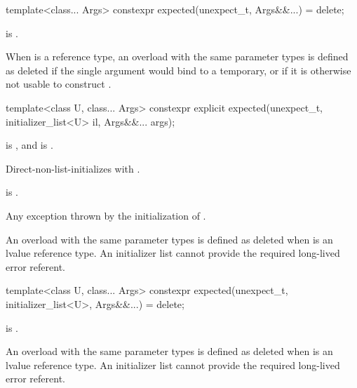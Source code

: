 %
\begin{itemdecl}
template<class... Args>
  constexpr expected(unexpect_t, Args&&...) = delete;
\end{itemdecl}

\begin{itemdescr}
\pnum
\constraints
{} is .

\pnum
\remarks
When  is a reference type, an overload with the same parameter types is defined as deleted if the single argument would bind  to a temporary, or if it is otherwise not usable to construct .
\end{itemdescr}

%
\begin{itemdecl}
template<class U, class... Args>
  constexpr explicit expected(unexpect_t, initializer_list<U> il, Args&&... args);
\end{itemdecl}

\begin{itemdescr}
\pnum
\constraints
{} is , and  is .

\pnum
\effects
Direct-non-list-initializes  with .

\pnum
\ensures
{} is .

\pnum
\throws
Any exception thrown by the initialization of .

\pnum
\remarks
An overload with the same parameter types is defined as deleted when  is an lvalue reference type. An initializer list cannot provide the required long-lived error referent.
\end{itemdescr}

%
\begin{itemdecl}
template<class U, class... Args>
  constexpr expected(unexpect_t, initializer_list<U>, Args&&...) = delete;
\end{itemdecl}

\begin{itemdescr}
\pnum
\constraints
{} is .

\pnum
\remarks
An overload with the same parameter types is defined as deleted when  is an lvalue reference type. An initializer list cannot provide the required long-lived error referent.
\end{itemdescr}

